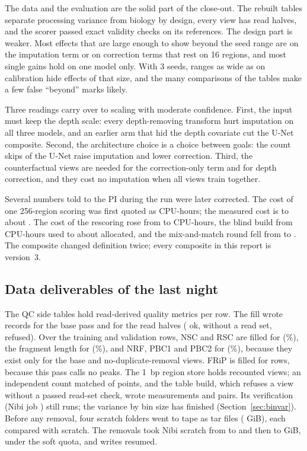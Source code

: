 \documentclass[pdflatex,sn-mathphys-num]{sn-jnl}
\newcommand{\lit}[1]{#1}
\newcommand{\cl}[1]{#1}
\begin{document}
\cl{The data and the evaluation are the solid part of the close-out. The rebuilt tables separate processing variance from biology by design, every view has read halves, and the scorer passed exact validity checks on its references. The design part is weaker. Most effects that are large enough to show beyond the seed range are on the imputation term or on correction terms that rest on \lit{16} regions, and most single gains hold on one model only. With \lit{3} seeds, ranges as wide as \refAECalR{} on calibration hide effects of that size, and the many comparisons of the tables make a few false ``beyond'' marks likely.}

\cl{Three readings carry over to scaling with moderate confidence. First, the input must keep the depth scale: every depth-removing transform hurt imputation on all three models, and an earlier arm that hid the depth covariate cut the U-Net composite. Second, the architecture choice is a choice between goals: the count skips of the U-Net raise imputation and lower correction. Third, the counterfactual views are needed for the correction-only term and for depth correction, and they cost no imputation when all views train together. \rescoreDiscuss{}}

\cl{Several numbers told to the PI during the run were later corrected. The cost of one \lit{256}-region scoring was first quoted as \oldScoreCost{} CPU-hours; the measured cost is \costAE{} to about \costUN{}. The cost of the rescoring rose from \oldCheckCost{} to \rescoreCost{} CPU-hours, the blind build from \blindOldCost{} CPU-hours used to about \blindNewCost{} allocated, and the mix-and-match round fell from \mixOldCost{} to \mixCost{}. The composite changed definition twice; every composite in this report is version~\lit{3}.}

\subsection{Data deliverables of the last night}

\cl{The QC side tables hold read-derived quality metrics per row. The fill wrote \qcWhole{} records for the base pass and \qcPrOne{} for the read halves (\qcOk{} ok, \qcNoRead{} without a read set, \qcRefused{} refused). Over the \qcRows{} training and validation rows, NSC and RSC are filled for \qcNsc{} (\qcNscPct{}\%), the fragment length for \qcFrag{} (\qcFragPct{}\%), and NRF, \lit{PBC1} and \lit{PBC2} for \qcNrf{} (\qcNrfPct{}\%), because they exist only for the base and no-duplicate-removal views. FRiP is filled for \qcFrip{} rows, because this pass calls no peaks. The \lit{1}~bp region store holds \bpViews{} recounted views; an independent count matched \bpPts{} of \bpPtsStore{} points, and the table build, which refuses a view without a passed read-set check, wrote \bpMeas{} measurements and \bpPairs{} pairs. Its verification (Nibi job \bpVerifyJob{}) still runs; the variance by bin size has finished (Section~\ref{sec:binvar}). Before any removal, four scratch folders went to tape as \arcTars{} tar files (\arcGib{} GiB), each compared with scratch. The removals took Nibi scratch from \scBefore{} to \scMid{} and then to \scAfter{} GiB, under the soft quota, and writes resumed.}
\end{document}
